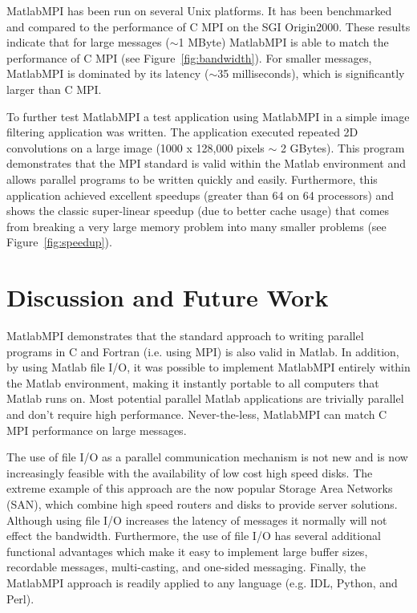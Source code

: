 \documentclass[11pt]{article}
\begin{document}
  MatlabMPI has been run on several Unix platforms.  It has been
benchmarked and compared to the performance of C MPI on the SGI Origin2000. 
These results indicate that for large messages ($\sim$1 MByte)
MatlabMPI is able to match the performance of C MPI (see
Figure~\ref{fig:bandwidth}).  For smaller messages, MatlabMPI is
dominated by its latency ($\sim$35 milliseconds), which is significantly
larger than C MPI.

  To further test MatlabMPI a test application using MatlabMPI in a
simple image filtering application was written. The application executed
repeated 2D convolutions on a large image (1000 x 128,000 pixels $\sim$
2 GBytes).  This program demonstrates that the MPI standard is valid
within the Matlab environment and allows parallel programs to be written
quickly and easily.  Furthermore, this application achieved excellent
speedups (greater than 64 on 64 processors) and shows the classic
super-linear speedup (due to better cache usage) that comes from
breaking a very large memory problem into many smaller problems (see
Figure~\ref{fig:speedup}).

\section{Discussion and Future Work}

   MatlabMPI demonstrates that the standard approach to writing parallel
programs in C and Fortran (i.e. using MPI) is also valid in Matlab.  In
addition, by using Matlab file I/O, it was possible to implement MatlabMPI
entirely within the Matlab environment, making it instantly portable
to all computers that Matlab runs on.  Most potential parallel Matlab
applications are trivially parallel and don't require high performance. 
Never-the-less, MatlabMPI can match C MPI performance on large messages.

  The use of file I/O as a parallel communication mechanism is not new
and is now increasingly feasible with the availability of low cost high
speed disks.  The extreme example of this approach are the now popular
Storage Area Networks (SAN), which combine high speed routers and disks
to provide server solutions. Although using file I/O increases the
latency of messages it normally will not effect the bandwidth. 
Furthermore, the use of file I/O has several additional functional
advantages which make it easy to implement large buffer sizes,
recordable messages, multi-casting, and  one-sided messaging.  Finally,
the MatlabMPI approach is readily applied to any language  (e.g. IDL,
Python, and Perl).
\end{document}
